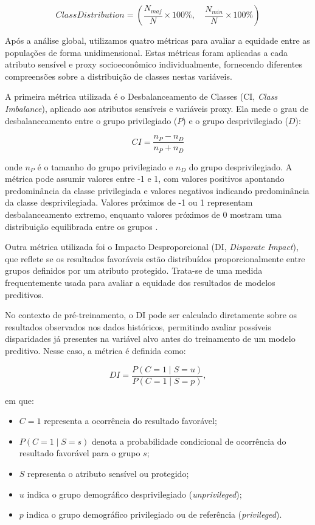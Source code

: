 $$ClassDistribution = \left( \frac{N_{maj}}{N} \times 100\%, \quad \frac{N_{min}}{N} \times 100\% \right)$$

Após a análise global, utilizamos quatro métricas para avaliar a equidade entre as populações de forma unidimensional. Estas métricas foram aplicadas a cada atributo sensível e proxy socioeconômico individualmente, fornecendo diferentes compreensões sobre a distribuição de classes nestas variáveis.

A primeira métrica utilizada é o Desbalanceamento de Classes (CI, \textit{Class Imbalance}), aplicado aos atributos sensíveis e variáveis proxy. Ela mede o grau de desbalanceamento entre o grupo privilegiado ($P$) e o grupo desprivilegiado ($D$):

$$ CI = \frac{n_P - n_D}{n_P + n_D} $$

onde $n_P$ é o tamanho do grupo privilegiado e $n_D$ do grupo desprivilegiado. A métrica pode assumir valores entre -1 e 1, com valores positivos apontando predominância da classe privilegiada e valores negativos indicando predominância da classe desprivilegiada. Valores próximos de -1 ou 1 representam desbalanceamento extremo, enquanto valores próximos de 0 mostram uma distribuição equilibrada entre os grupos \cite{hardt2021sagemaker}.

Outra métrica utilizada foi o Impacto Desproporcional (DI, \textit{Disparate Impact}), que reflete se os resultados favoráveis estão distribuídos proporcionalmente entre grupos definidos por um atributo protegido. Trata-se de uma medida frequentemente usada para avaliar a equidade dos resultados de modelos preditivos.

No contexto de pré-treinamento, o DI pode ser calculado diretamente sobre os resultados observados nos dados históricos, permitindo avaliar possíveis disparidades já presentes na variável alvo antes do treinamento de um modelo preditivo. Nesse caso, a métrica é definida como:

\begin{equation}
    DI =
    \frac{P(C=1 \mid S=u)}
    {P(C=1 \mid S=p)},
\end{equation}

\noindent em que:

\begin{itemize}
    \item $C=1$ representa a ocorrência do resultado favorável;
    \item $P(C=1 \mid S=s)$ denota a probabilidade condicional de ocorrência do resultado favorável para o grupo $s$;
    \item $S$ representa o atributo sensível ou protegido;
    \item $u$ indica o grupo demográfico desprivilegiado (\textit{unprivileged});
    \item $p$ indica o grupo demográfico privilegiado ou de referência (\textit{privileged}).
\end{itemize}

